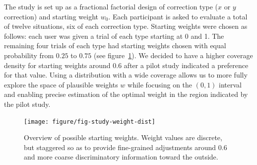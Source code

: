 \documentclass[12pt]{article}\usepackage[]{graphicx}\usepackage[]{color}
\newcommand{\done}[2][inline]{\todo[color=SpringGreen, #1]{#2}}  %
\newcommand{\newdo}[1]{\todo[inline, color=Plum]{#1}} %
\begin{document}
The study is set up as a fractional factorial design of correction type ($x$ or $y$ correction) and starting weight $w_0$. Each participant is asked to evaluate a total of twelve situations, six of each correction type.
Starting weights were chosen as follows: each user was given a trial of each type starting at 0 and 1. The remaining four trials of each type had starting weights chosen with equal probability from $0.25$ to $0.75$ %
(see figure~\ref{fig:weightdist}). 
We decided to  have a higher coverage density for starting weights around 0.6 after a pilot study indicated a preference for that value. Using a distribution with a wide coverage allows us to more fully explore the space of plausible weights $w$ while focusing on the $(0,1)$ interval and enabling precise estimation of the optimal weight in the region indicated by the pilot study. %


\begin{figure}[ht]\centering
\texttt{[image: figure/fig-study-weight-dist]}
\caption{Overview of possible starting weights. Weight values are discrete, but staggered so as to provide fine-grained adjustments around 0.6 and more coarse discriminatory information toward the outside.}\label{fig:weightdist}
\end{figure}

\end{document}

